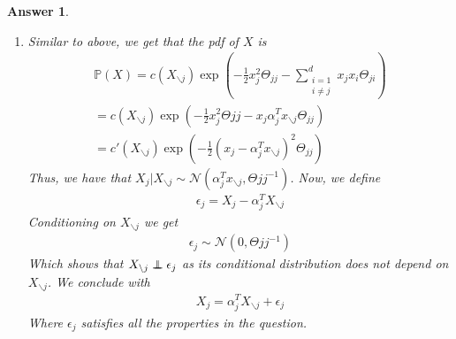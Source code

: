 \documentclass[12pt]{article}
\newcommand\independent{\protect\mathpalette{\protect\independenT}{\perp}}
\def\independenT#1#2{\mathrel{\rlap{$#1#2$}\mkern2mu{#1#2}}}
\theoremstyle{colon}
\newtheorem*{answer}{Answer}
\begin{document}
\begin{answer}
\begin{enumerate}[label=\arabic*)]
\begin{enumerate}[label=\alph*)]
        \item Similar to above, we get that the pdf of $X$ is
          \begin{gather*}
            \mathbb{P}(X) = c(X_{\backslash j}) \exp(-\frac{1}{2} x_j^2 \Theta_{jj} - \sum_{\substack{i = 1 \\ i \neq j}}^d x_j x_i \Theta_{ji}) \\
            = c(X_{\backslash j}) \exp(-\frac{1}{2} x_j^2 \Theta{jj} - x_j \alpha_j^T x_{\backslash j} \Theta_{jj}) \\
            = c'(X_{\backslash j}) \exp(-\frac{1}{2} (x_j - \alpha_j^T x_{\backslash j})^2 \Theta_{jj})
          \end{gather*}
          Thus, we have that $X_j | X_{\backslash j} \sim \mathcal{N}(\alpha_j^T x_{\backslash j}, \Theta{jj}^{-1})$. Now, we define
          \begin{gather*}
            \epsilon_j = X_j - \alpha_j^T X_{\backslash j}
          \end{gather*}
          Conditioning on $X_{\backslash j}$ we get
          \begin{gather*}
            \epsilon_j \sim \mathcal{N}(0, \Theta{jj}^{-1})
          \end{gather*}
          Which shows that $X_{\backslash j} \independent \epsilon_j$ as its conditional distribution does not depend on $X_{\backslash j}$. We conclude with
          \begin{gather*}
            X_j = \alpha_j^T X_{\backslash j} + \epsilon_j
          \end{gather*}
          Where $\epsilon_j$ satisfies all the properties in the question.
      \end{enumerate}


\end{enumerate}
\end{answer}
\end{document}
